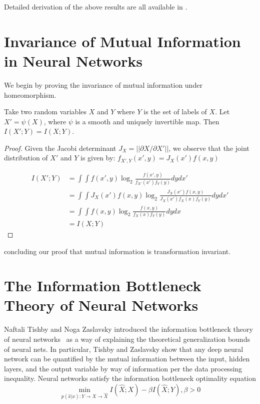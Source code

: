 Detailed derivation of the above results are all available in \cite{coverthomas2006}.

\section{Invariance of Mutual Information in Neural Networks}

We begin by proving the invariance of mutual information under homeomorphism.

\begin{theorem}
Take two random variables $X$ and $Y$ where $Y$ is the set of labels of $X$.
Let $X' = \psi(X)$, where $\psi$ is a smooth and uniquely invertible map.
Then $I(X'; Y) = I(X; Y)$.
\end{theorem}

\begin{proof}
Given the Jacobi determinant $J_X = ||\partial X/ \partial X'||$, we observe that the joint distribution of $X'$ and $Y$ is given by: $f_{X', Y}(x', y) = J_X(x')f(x, y)$

\begin{align*}
I(X'; Y) & = \int \int f(x', y) \log_2 \frac{f(x', y)}{f_{X'}(x') f_{Y}(y)} dy dx'\\
& = \int \int J_X(x')f(x, y) \log_2 \frac{J_X(x')f(x, y)}{J_X(x')f_{X}(x)f_{Y}(y)} dy dx'\\
& = \int \int f(x, y) \log_2 \frac{f(x, y)}{f_{X}(x) f_{Y}(y)} dy dx \\
& = I(X; Y)
\end{align*}
\end{proof}
concluding our proof that mutual information is transformation invariant. 

\section{The Information Bottleneck Theory of Neural Networks}
Naftali Tishby and Noga Zaslavsky introduced the information bottleneck theory of neural networks~\cite{tishby2015deep} as a way of explaining the theoretical generalization bounds of neural nets.
In particular, Tishby and Zaslavsky show that any deep neural network can be quantified by the mutual information between the input, hidden layers, and the output variable by way of information per the data processing inequality.
Neural networks satisfy the information bottleneck optimality equation
$$\min_{p(\hat{x}|x):Y \to X \to \hat{X}} I(\hat{X};X) - \beta I(\hat{X}; Y) , \beta > 0$$